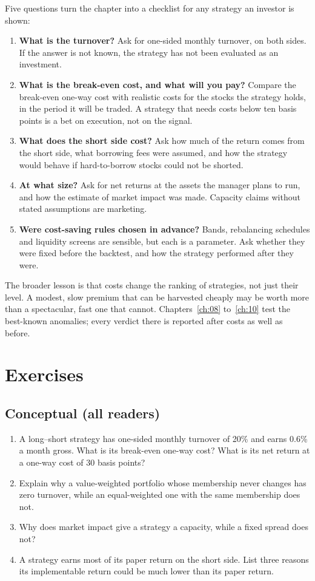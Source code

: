 Five questions turn the chapter into a checklist for any strategy an investor is shown:

\begin{enumerate}
  \item \textbf{What is the turnover?} Ask for one-sided monthly turnover, on both sides. If the answer is not known, the strategy has not been evaluated as an investment.
  \item \textbf{What is the break-even cost, and what will you pay?} Compare the break-even one-way cost with realistic costs for the stocks the strategy holds, in the period it will be traded. A strategy that needs costs below ten basis points is a bet on execution, not on the signal.
  \item \textbf{What does the short side cost?} Ask how much of the return comes from the short side, what borrowing fees were assumed, and how the strategy would behave if hard-to-borrow stocks could not be shorted.
  \item \textbf{At what size?} Ask for net returns at the assets the manager plans to run, and how the estimate of market impact was made. Capacity claims without stated assumptions are marketing.
  \item \textbf{Were cost-saving rules chosen in advance?} Bands, rebalancing schedules and liquidity screens are sensible, but each is a parameter. Ask whether they were fixed before the backtest, and how the strategy performed after they were.
\end{enumerate}

The broader lesson is that costs change the ranking of strategies, not just their level. A modest, slow premium that can be harvested cheaply may be worth more than a spectacular, fast one that cannot. Chapters~\ref{ch:08} to~\ref{ch:10} test the best-known anomalies; every verdict there is reported after costs as well as before.

\section*{Exercises}

\subsection*{Conceptual (all readers)}

\begin{enumerate}
  \item A long--short strategy has one-sided monthly turnover of 20\% and earns 0.6\% a month gross. What is its break-even one-way cost? What is its net return at a one-way cost of 30 basis points?
  \item Explain why a value-weighted portfolio whose membership never changes has zero turnover, while an equal-weighted one with the same membership does not.
  \item Why does market impact give a strategy a capacity, while a fixed spread does not?
  \item A strategy earns most of its paper return on the short side. List three reasons its implementable return could be much lower than its paper return.
\end{enumerate}

